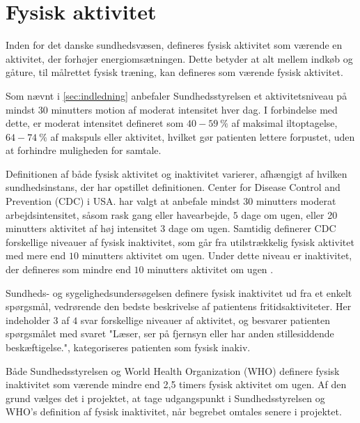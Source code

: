 \section{Fysisk aktivitet}

Inden for det danske sundhedsvæsen, defineres fysisk aktivitet som værende en aktivitet, der forhøjer energiomsætningen. Dette betyder at alt mellem indkøb og gåture, til målrettet fysisk træning, kan defineres som værende fysisk aktivitet\citep{motionsraad2007, terkelsen2015}.

Som nævnt i \ref{sec:indledning} anbefaler Sundhedsstyrelsen et aktivitetsniveau på mindst 30 minutters motion af moderat intensitet hver dag. I forbindelse med dette, er moderat intensitet defineret som $40-59~\%$ af maksimal iltoptagelse, $64-74~\%$ af makspuls eller aktivitet, hvilket gør patienten lettere forpustet, uden at forhindre muligheden for samtale. 

Definitionen af både fysisk aktivitet og inaktivitet varierer, afhængigt af hvilken sundhedsinstans, der har opstillet definitionen. Center for Disease Control and Prevention (CDC) i USA. har valgt at anbefale mindst $30$ minutters moderat arbejdsintensitet, såsom rask gang eller havearbejde, $5$ dage om ugen, eller 20 minutters aktivitet af høj intensitet 3 dage om ugen. Samtidig definerer CDC forskellige niveauer af fysisk inaktivitet, som går fra utilstrækkelig fysisk aktivitet med mere end $10$ minutters aktivitet om ugen. Under dette niveau er inaktivitet, der defineres som mindre end $10$ minutters aktivitet om ugen \citep{motionsraad2007}.

Sundheds- og sygelighedsundersøgelsen definere fysisk inaktivitet ud fra et enkelt spørgsmål, vedrørende den bedste beskrivelse af patientens fritidsaktiviteter. Her indeholder $3$ af $4$ svar forskellige niveauer af aktivitet, og besvarer patienten spørgsmålet med svaret "Læser, ser på fjernsyn eller har anden stillesiddende beskæftigelse.", kategoriseres patienten som fysisk inakiv\citep{motionsraad2007}.

Både Sundhedsstyrelsen og World Health Organization (WHO) definere fysisk inaktivitet som værende mindre end 2,5 timers fysisk aktivitet om ugen. Af den grund vælges det i projektet, at tage udgangspunkt i Sundhedsstyrelsen og WHO's definition af fysisk inaktivitet, når begrebet omtales senere i projektet\citep{motionsraad2007}.